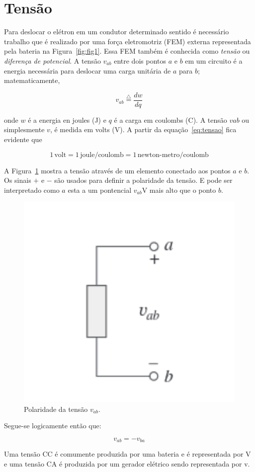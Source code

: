 \section{Tensão}

Para deslocar o elétron em um condutor determinado sentido é necessário trabalho
que é realizado por uma força eletromotriz (FEM) externa representada pela
bateria na Figura~\ref{fig:fig1}. Essa FEM também é conhecida como
\textit{tensão} ou \textit{diferença de potencial}. A tensão \( v_{ab} \) entre
dois pontos \( a \) e \( b \) em um circuito é a energia necessária para
deslocar uma carga unitária de \( a \) para \( b \); matematicamente,

\begin{equation}
	\label{eq:tensao}
	v_{ab} \overset{\triangle}{=} \frac{dw}{dq}
\end{equation}

onde \( w \) é a energia en joules (J) e \( q \) é  a carga em coulombs (C). A
tensão \( v{ab} \) ou simplesmente \( v \), é medida em volts (V). A partir da
equação~\ref{eq:tensao} fica evidente que

\[
	1\,\text{volt} = 1\,\text{joule}/\text{coulomb} = 1\,\text{newton-metro}/\text{coulomb}
\]

A Figura~\ref{fig:fig2} mostra a tensão através de um elemento conectado aos
pontos \( a \) e \( b \). Os sinais \( + \) e \( - \) são usados para definir a
polaridade da tensão. E pode ser interpretado como \( a \) esta a um pontencial
\( v_{ab} \)V mais alto que o ponto \( b \).

\begin{figure}[H]
	\centering
	\setlength{\fboxsep}{0pt}
	\includegraphics[height=0.15\textwidth]{./fig/fig2.png}
	\caption{Polaridade da tensão \( v_{ab} \).}
	\label{fig:fig2}
\end{figure}

Segue-se logicamente então que:

\[
	v_{ab} = -v_{ba}
\]

Uma tensão CC é comumente produzida por uma bateria e é representada por V e uma
tensão CA é produzida por um gerador elétrico sendo representada por v.
